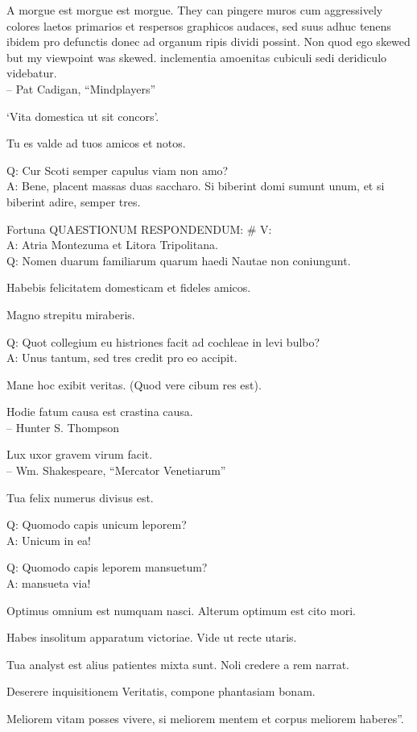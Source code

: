 \documentclass[titlepage,12pt]{memoir}
\begin{document}
A morgue est morgue est morgue. They can pingere muros cum aggressively
colores laetos primarios et respersos graphicos audaces, sed suus adhuc tenens
ibidem pro defunctis donec ad organum ripis dividi possint. Non quod ego
skewed but my viewpoint was skewed. inclementia
amoenitas cubiculi sedi deridiculo videbatur.
\\-- Pat Cadigan, “Mindplayers”

‘Vita domestica ut sit concors’.

Tu es valde ad tuos amicos et notos.

Q: Cur Scoti semper capulus viam non amo?\\
A: Bene, placent massas duas saccharo. Si biberint
domi sumunt unum, et si biberint
adire, semper tres.

Fortuna QUAESTIONUM RESPONDENDUM: \# V:\\
A: Atria Montezuma et Litora Tripolitana.
\\Q: Nomen duarum familiarum quarum haedi Nautae non coniungunt.

 Habebis felicitatem domesticam et fideles amicos.

Magno strepitu miraberis.

Q: Quot collegium eu histriones facit ad cochleae in levi bulbo?\\
A: Unus tantum, sed tres credit pro eo accipit.

Mane hoc exibit veritas. (Quod vere cibum res est).

Hodie fatum causa est crastina causa.
\\-- Hunter S. Thompson

Lux uxor gravem virum facit.
\\-- Wm. Shakespeare, “Mercator Venetiarum”

Tua felix numerus divisus est.

Q: Quomodo capis unicum leporem?\\
A: Unicum in ea!

Q: Quomodo capis leporem mansuetum?\\
A: mansueta via!

Optimus omnium est numquam nasci. Alterum optimum est cito mori.

Habes insolitum apparatum victoriae. Vide ut recte utaris.

Tua analyst est alius patientes mixta sunt. Noli credere a
rem narrat.

Deserere inquisitionem Veritatis, compone phantasiam bonam.

Meliorem vitam posses vivere, si meliorem mentem et corpus meliorem haberes”.
\end{document}
